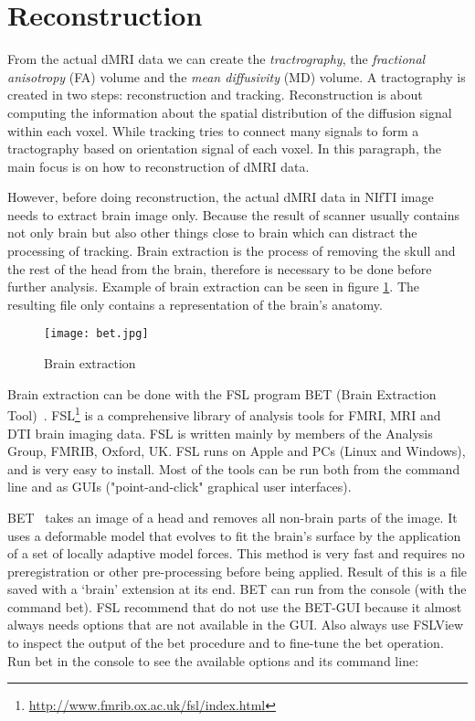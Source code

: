 

\section{Reconstruction}
\label{sec:reconstruction}
From the actual dMRI data we can create the \emph{tractrography}, the \emph{fractional anisotropy} (FA) volume and the \emph{mean diffusivity} (MD) volume.
A tractography is created in two steps: reconstruction and tracking. Reconstruction is about computing the information about the spatial distribution of the diffusion signal within each voxel. While tracking tries to connect many signals to form a tractography based on orientation signal of each voxel. In this paragraph, the main focus is on how to reconstruction of dMRI data.   

However, before doing reconstruction, the actual dMRI data in NIfTI image needs to extract brain image only. Because the result of scanner usually contains not only brain but also other things close to brain which can distract the processing of tracking. Brain extraction is the process of removing the skull and the rest of the head from the brain, therefore is necessary to be done before further analysis. Example of brain extraction can be seen in figure \ref{Fig:bet}. The resulting file only contains a representation of the brain's anatomy.

\begin{figure} 
  \centering 
  \texttt{[image: bet.jpg]}
  \caption{Brain extraction}
  \label{Fig:bet}
\end{figure}

Brain extraction can be done with the FSL program BET (Brain Extraction Tool)~\cite{smith2002automated}. FSL\footnote{\url{http://www.fmrib.ox.ac.uk/fsl/index.html}} is a comprehensive library of analysis tools for FMRI, MRI and DTI brain imaging data. FSL is written mainly by members of the Analysis Group, FMRIB, Oxford, UK. FSL runs on Apple and PCs (Linux and Windows), and is very easy to install. Most of the tools can be run both from the command line and as GUIs ("point-and-click" graphical user interfaces).

BET~\cite{smith2002automated} takes an image of a head and removes all non-brain parts of the image. It uses a deformable model that evolves to fit the brain's surface by the application of a set of locally adaptive model forces. This method is very fast and requires no preregistration or other pre-processing before being applied. Result of this is a file saved with a ‘brain’ extension at its end. BET can run from the console (with the command bet). FSL recommend that do not use the BET-GUI because it almost always needs options that are not available in the GUI. Also always use FSLView to inspect the output of the bet procedure and to fine-tune the bet operation. Run bet in the console to see the available options and its command line:

